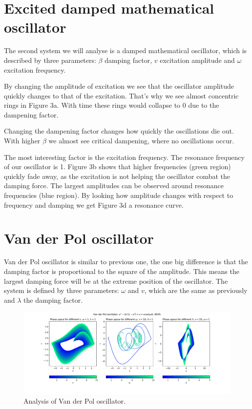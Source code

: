 \documentclass[12pt, a4paper]{article}
\begin{document}
\section{Excited damped mathematical oscillator} 

The second system we will analyse is a damped mathematical oscillator, which is described by three parameters: $\beta$ damping factor, $v$ excitation amplitude and $\omega$ excitation frequency.

By changing the amplitude of excitation we see that the oscillator amplitude quickly changes to that of the excitation. That's why we see almost concentric rings in Figure 3a. With time these rings would collapse to 0 due to the dampening factor.

Changing the dampening factor changes how quickly the oscillations die out. With higher $\beta$ we almost see critical dampening, where no oscillations occur.

The most interesting factor is the excitation frequency. The resonance frequency of our oscillator is 1. Figure 3b shows that higher frequencies (green region) quickly fade away, as the excitation is not helping the oscillator combat the damping force. The largest amplitudes can be observed around resonance frequencies (blue region). By looking how amplitude changes with respect to frequency and damping we get Figure 3d a resonance curve.

\section{Van der Pol oscillator}

Van der Pol oscillator is similar to previous one, the one big difference is that the damping factor is proportional to the square of the amplitude. This means the largest damping force will be at the extreme position of the oscillator. The system is defined by three parameters: $\omega$ and $v$, which are the same as previously and $\lambda$ the damping factor.

\begin{figure}[hbtp]
  \begin{center}
  \includegraphics[width=15cm]{graphs/van_der_pol.pdf}
  \end{center}
  \vspace*{-7mm}
  \caption{Analysis of Van der Pol oscillator.}
\end{figure}
\end{document}
